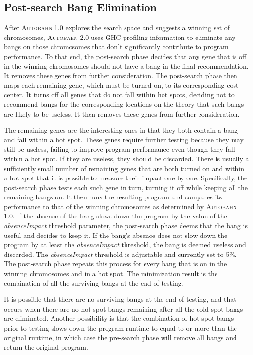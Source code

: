 \documentclass[format=sigplan, review=true, 9pt]{acmart}
\newcommand{\hotspot}[0]{hot spot}
\newcommand{\hotspots}[0]{hot spots}
\newcommand{\coldspot}[0]{cold spot}
\newcommand{\useless}[0]{useless}
\newcommand{\Ao}[0]{\textsc{Autobahn 1.0}}
\newcommand{\At}[0]{\textsc{Autobahn 2.0}}
\newcommand{\preopt}[0]{pre-search}
\newcommand{\postopt}[0]{post-search}
\newcommand{\Postopt}[0]{Post-search}
\newcommand{\absim}[0]{\textit{absenceImpact}}
\begin{document}
\subsection{\Postopt{} Bang Elimination}

After \Ao{} explores the search space and suggests a winning set of
chromosomes, \At{} uses GHC profiling information to eliminate any
bangs on those chromosomes that don't significantly contribute to
program performance. To that end, 
the \postopt{} phase decides that any gene that is off in the winning
chromosomes should not have a bang in the final recommendation.
It removes these genes from further consideration. 
The \postopt{} phase then maps each remaining gene, which must be
turned on, to its corresponding cost center.  It turns off all genes
that do not fall within \hotspots{}, deciding not to recommend bangs
for the corresponding locations on the theory that such bangs are
likely to be \useless{}.  It then removes these genes from further
consideration. 

The remaining genes are the interesting ones in that they both
contain a bang and fall within a \hotspot{}. These genes require
further testing because they may still be \useless{}, failing to
improve program performance even though they fall within a \hotspot{}.
If they are \useless{}, they should be discarded. 
There is usually a sufficiently small number of remaining genes that
are both turned on and within a \hotspot{} that it is possible to
measure their impact one by one. Specifically, 
the \postopt{} phase tests each such gene in turn, turning
it off while keeping all the remaining bangs on.  It 
then runs the resulting program and compares its performance to that
of the winning chromosomes as determined by \Ao{}.
If the absence of the bang slows down the program by the value of the \absim{}
threshold parameter, the \postopt{} phase deems that the bang is useful and
decides to keep it. 
If the bang's absence does not slow down the program by at
least the \absim{} threshold, the bang is deemed \useless{} and
discarded. The \absim{} threshold is adjustable and currently set to
5\%. The \postopt{} phase repeats this process for every bang
that is on in the winning chromosomes and in a \hotspot{}. 
The minimization result is the combination of all the surviving
bangs at the end of testing.

It is possible that there are no surviving bangs at the end of testing, and that occurs when
there are no \hotspot{} bangs remaining after all the \coldspot{} bangs are eliminated. 
Another possibility is that the combination of \hotspot{} bangs prior to testing slows down 
the program runtime to equal to or more than the original runtime, in which case the \preopt{}
phase will remove all bangs and return the original program.
\end{document}
